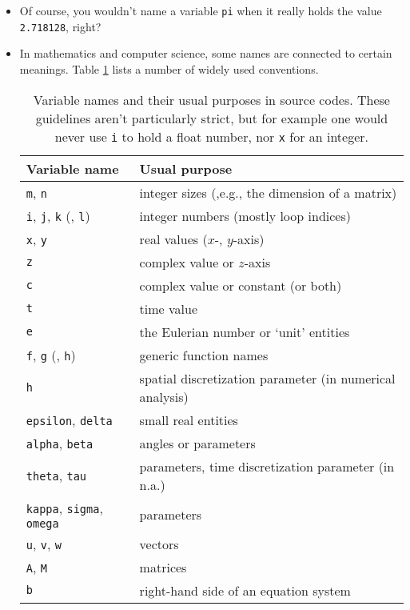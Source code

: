 \begin{itemize}
\item Of course, you wouldn't name a variable \lstinline!pi! when it really holds the value \lstinline!2.718128!, right?
\item In mathematics and computer science, some names are connected to certain meanings. Table \ref{table:typical-variable-usage} lists a number of widely used conventions.

\begin{table}
\centering
\begin{tabular}{ll}
\toprule
Variable name                                                 & Usual purpose\\\midrule
\lstinline!m!, \lstinline!n!                                  & integer sizes (,e.g., the dimension of a matrix)\\
\lstinline!i!, \lstinline!j!, \lstinline!k! (, \lstinline!l!) & integer numbers (mostly loop indices)\\
\lstinline!x!, \lstinline!y!                                  & real values ($x$-, $y$-axis)\\
\lstinline!z!                                                 & complex value or $z$-axis\\
\lstinline!c!                                                 & complex value or constant (or both)\\
\lstinline!t!                                                 & time value\\
\lstinline!e!                                                 & the Eulerian number or `unit' entities\\
\lstinline!f!, \lstinline!g! (, \lstinline!h!)                & generic function names\\
\lstinline!h!                                                 & spatial discretization parameter (in numerical analysis)\\
\lstinline!epsilon!, \lstinline!delta!                        & small real entities\\
\lstinline!alpha!, \lstinline!beta!                           & angles or parameters\\
\lstinline!theta!, \lstinline!tau!                            & parameters, time discretization parameter (in n.a.)\\
\lstinline!kappa!, \lstinline!sigma!, \lstinline!omega!       & parameters\\
\lstinline!u!, \lstinline!v!, \lstinline!w!                   & vectors\\
\lstinline!A!, \lstinline!M!                                  & matrices\\
\lstinline!b!                                                 & right-hand side of an equation system\\\bottomrule
\end{tabular}
\caption{Variable names and their usual purposes in source codes. These guidelines aren't particularly strict, but for example one would never use \lstinline!i! to hold a float number, nor \lstinline!x! for an integer.}
\label{table:typical-variable-usage}
\end{table}
\end{itemize}

